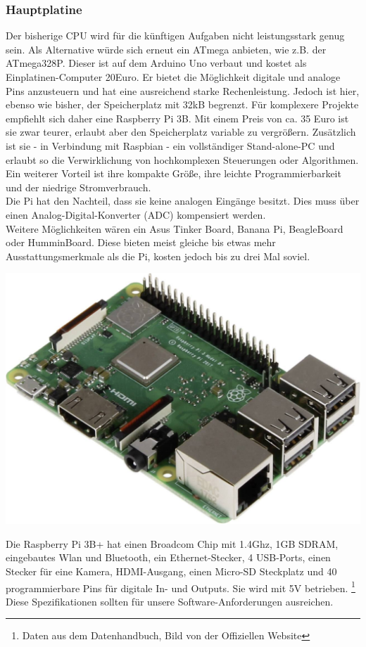\documentclass[a4paper,cleardoubleempty,BCOR1cm]{book}
\begin{document}
\subsubsection{Hauptplatine}
Der bisherige CPU wird für die künftigen Aufgaben nicht leistungsstark genug sein. Als Alternative würde sich erneut ein ATmega anbieten, wie z.B. der ATmega328P. Dieser ist auf dem Arduino Uno verbaut und kostet als Einplatinen-Computer 20Euro. Er bietet die Möglichkeit digitale und analoge Pins anzusteuern und hat eine ausreichend starke Rechenleistung. Jedoch ist hier, ebenso wie bisher, der Speicherplatz mit 32kB begrenzt. Für komplexere Projekte empfiehlt sich daher eine Raspberry Pi 3B. Mit einem Preis von ca. 35 Euro ist sie zwar teurer, erlaubt aber den Speicherplatz variable zu vergrößern. Zusätzlich ist sie - in Verbindung mit Raspbian - ein vollständiger Stand-alone-PC und erlaubt so die Verwirklichung von hochkomplexen Steuerungen oder Algorithmen. Ein weiterer Vorteil ist ihre kompakte Größe, ihre leichte Programmierbarkeit und der niedrige Stromverbrauch. \\
Die Pi hat den Nachteil, dass sie keine analogen Eingänge besitzt. Dies muss über einen  Analog-Digital-Konverter (ADC) kompensiert werden. \\
Weitere Möglichkeiten wären ein Asus Tinker Board, Banana Pi, BeagleBoard oder HumminBoard. Diese bieten meist gleiche bis etwas mehr Ausstattungsmerkmale als die Pi, kosten jedoch bis zu drei Mal soviel. 


\includegraphics[scale=0.25]{images/Pi.jpg}

Die Raspberry Pi 3B+ hat einen Broadcom Chip mit 1.4Ghz, 1GB SDRAM, eingebautes Wlan und Bluetooth, ein Ethernet-Stecker, 4 USB-Ports, einen Stecker für eine Kamera, HDMI-Ausgang, einen Micro-SD Steckplatz und 40 programmierbare Pins für digitale In- und Outputs. Sie wird mit 5V betrieben. \footnote{Daten aus dem Datenhandbuch, Bild von der Offiziellen Website}\\
Diese Spezifikationen sollten für unsere Software-Anforderungen ausreichen. 
\end{document}
